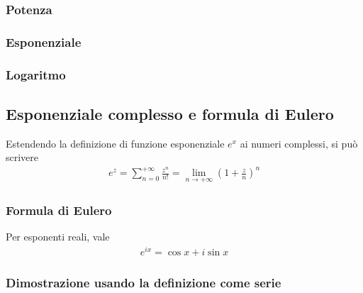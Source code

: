 \documentclass[letterpaper,10pt,italian]{jupyterBook}
\begin{document}
\subsubsection{Potenza}
\label{\detokenize{ch/algebra/complex-algebra-notes:potenza}}\label{\detokenize{ch/algebra/complex-algebra-notes:math-hs-algebra-complex-notes-fun-power}}

\subsubsection{Esponenziale}
\label{\detokenize{ch/algebra/complex-algebra-notes:esponenziale}}\label{\detokenize{ch/algebra/complex-algebra-notes:math-hs-algebra-complex-notes-fun-exp}}

\subsubsection{Logaritmo}
\label{\detokenize{ch/algebra/complex-algebra-notes:logaritmo}}\label{\detokenize{ch/algebra/complex-algebra-notes:math-hs-algebra-complex-notes-fun-log}}

\subsection{Esponenziale complesso e formula di Eulero}
\label{\detokenize{ch/algebra/complex-algebra-notes:esponenziale-complesso-e-formula-di-eulero}}\label{\detokenize{ch/algebra/complex-algebra-notes:math-hs-algebra-complex-notes-euler}}
\sphinxAtStartPar
Estendendo la definizione di funzione esponenziale \(e^x\) ai numeri complessi, si può scrivere
\begin{equation*}
\begin{split}e^z = \sum_{n = 0}^{+\infty} \frac{z^n}{n!} = \lim_{n \rightarrow +\infty} \left( 1 + \frac{z}{n} \right)^n\end{split}
\end{equation*}



\subsubsection{Formula di Eulero}
\label{\detokenize{ch/algebra/complex-algebra-notes:formula-di-eulero}}
\sphinxAtStartPar
Per esponenti reali, vale
\begin{equation*}
\begin{split}e^{i x} = \cos x + i \sin x\end{split}
\end{equation*}\subsubsection*{Dimostrazione usando la definizione come serie}
\end{document}
